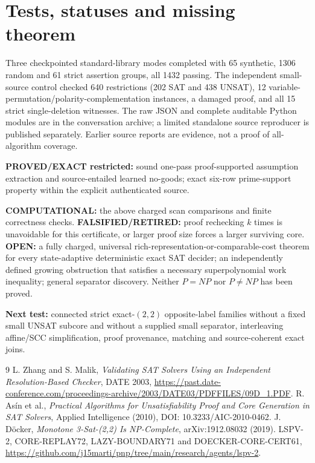 \documentclass[11pt]{article}
\begin{document}
\section{Tests, statuses and missing theorem}
Three checkpointed standard-library modes completed with 65 synthetic, 1306 random and 61 strict assertion groups, all 1432 passing. The independent small-source control checked 640 restrictions (202 SAT and 438 UNSAT), 12 variable-permutation/polarity-complementation instances, a damaged proof, and all 15 strict single-deletion witnesses. The raw JSON and complete auditable Python modules are in the conversation archive; a limited standalone source reproducer is published separately. Earlier source reports are evidence, not a proof of all-algorithm coverage.
\par\noindent\textbf{PROVED/EXACT restricted:} sound one-pass proof-supported assumption extraction and source-entailed learned no-goods; exact six-row prime-support property within the explicit authenticated source.
\par\noindent\textbf{COMPUTATIONAL:} the above charged scan comparisons and finite correctness checks. \textbf{FALSIFIED/RETIRED:} proof rechecking $k$ times is unavoidable for this certificate, or larger proof size forces a larger surviving core. \textbf{OPEN:} a fully charged, universal rich-representation-or-comparable-cost theorem for every state-adaptive deterministic exact SAT decider; an independently defined growing obstruction that satisfies a necessary superpolynomial work inequality; general separator discovery. Neither $P=NP$ nor $P\ne NP$ has been proved.
\par\noindent\textbf{Next test:} connected strict exact-$(2,2)$ opposite-label families without a fixed small UNSAT subcore and without a supplied small separator, interleaving affine/SCC simplification, proof provenance, matching and source-coherent exact joins.
\begin{thebibliography}{9}
 L. Zhang and S. Malik, \emph{Validating SAT Solvers Using an Independent Resolution-Based Checker}, DATE 2003, \url{https://past.date-conference.com/proceedings-archive/2003/DATE03/PDFFILES/09D_1.PDF}.
 R. As\'in et al., \emph{Practical Algorithms for Unsatisfiability Proof and Core Generation in SAT Solvers}, Applied Intelligence (2010), DOI: 10.3233/AIC-2010-0462.
 J. D\"ocker, \emph{Monotone 3-Sat-(2,2) Is NP-Complete}, arXiv:1912.08032 (2019).
 LSPV-2, CORE-REPLAY72, LAZY-BOUNDARY71 and DOECKER-CORE-CERT61, \url{https://github.com/j15marti/pnp/tree/main/research/agents/lspv-2}.
\end{thebibliography}
\end{document}
